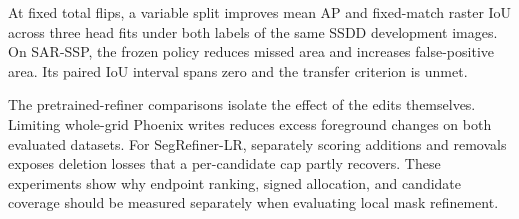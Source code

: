 \documentclass[journal]{IEEEtran}
\begin{document}
At fixed total flips, a variable split improves mean AP and fixed-match raster IoU across three head fits under both labels of the same SSDD development images. On SAR-SSP, the frozen policy reduces missed area and increases false-positive area. Its paired IoU interval spans zero and the transfer criterion is unmet.

The pretrained-refiner comparisons isolate the effect of the edits themselves. Limiting whole-grid Phoenix writes reduces excess foreground changes on both evaluated datasets. For SegRefiner-LR, separately scoring additions and removals exposes deletion losses that a per-candidate cap partly recovers. These experiments show why endpoint ranking, signed allocation, and candidate coverage should be measured separately when evaluating local mask refinement.

\end{document}

